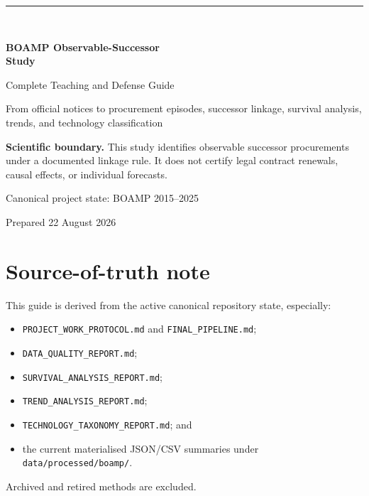 \documentclass[10pt,a4paper]{article}
\begin{document}
\hypersetup{pageanchor=false}

\begin{titlepage}
  \color{Ink}
  \vspace*{18mm}
  {\color{Gold}\rule{34mm}{2.4pt}}\\[14mm]
  {\headingfont\fontsize{29}{34}\selectfont\bfseries\color{DeepBlue}
   BOAMP Observable-Successor\\Study\par}
  \vspace{5mm}
  {\headingfont\fontsize{19}{23}\selectfont\color{Blue}
   Complete Teaching and Defense Guide\par}
  \vspace{12mm}
  {\large From official notices to procurement episodes, successor linkage,
   survival analysis, trends, and technology classification\par}
  \vfill
  \begin{tcolorbox}[colback=PaleGold,colframe=Gold!55,boxrule=0.7pt,arc=2mm,
      left=5mm,right=5mm,top=4mm,bottom=4mm]
    \textbf{Scientific boundary.} This study identifies observable successor
    procurements under a documented linkage rule. It does not certify legal
    contract renewals, causal effects, or individual forecasts.
  \end{tcolorbox}
  \vspace{12mm}
  {\sffamily\small Canonical project state: BOAMP 2015--2025\par}
  {\sffamily\small Prepared 22 August 2026\par}
\end{titlepage}

\begingroup
\footnotesize
\setlength{\parskip}{0pt}
\tableofcontents
\endgroup
\clearpage
\hypersetup{pageanchor=true}



\section*{Source-of-truth note}
This guide is derived from the active canonical repository state, especially:
\begin{itemize}
  \item \texttt{PROJECT\_WORK\_PROTOCOL.md} and \texttt{FINAL\_PIPELINE.md};
  \item \texttt{DATA\_QUALITY\_REPORT.md};
  \item \texttt{SURVIVAL\_ANALYSIS\_REPORT.md};
  \item \texttt{TREND\_ANALYSIS\_REPORT.md};
  \item \texttt{TECHNOLOGY\_TAXONOMY\_REPORT.md}; and
  \item the current materialised JSON/CSV summaries under
        \texttt{data/processed/boamp/}.
\end{itemize}
Archived and retired methods are excluded.
\end{document}
